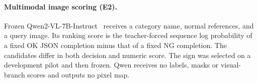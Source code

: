 \paragraph{Multimodal image scoring (E2).}
Frozen Qwen2-VL-7B-Instruct~\cite{wang2024qwen2vl} receives a category name, normal references, and a query
image. Its ranking score is the teacher-forced sequence log probability of a fixed
OK JSON completion minus that of a fixed NG completion. The candidates differ in both
decision and numeric score. The sign was selected on a development pilot and then
frozen. Qwen receives no labels, masks or visual-branch scores and outputs no pixel map.
